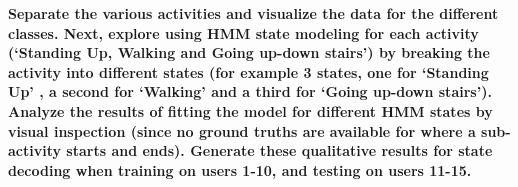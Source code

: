 \item \textbf{Separate the  various  activities  and  visualize  the  data  for  the  different  classes.  Next,  explore  using HMM  state  modeling  for  each activity (‘Standing  Up,  Walking  and  Going  up-down  stairs’)  by breaking  the activity into different states (for example 3 states, one for ‘Standing Up’  ,  a second for ‘Walking’  and a third  for  ‘Going  up-down  stairs’).  Analyze  the  results  of fitting  the  model  for different  HMM  states  by visual  inspection  (since  no  ground  truths  are available for where  a  sub-activity  starts  and  ends).  Generate  these  qualitative  results  for  state  decoding  when training  on  users 1-10, and testing  on users 11-15.} 
